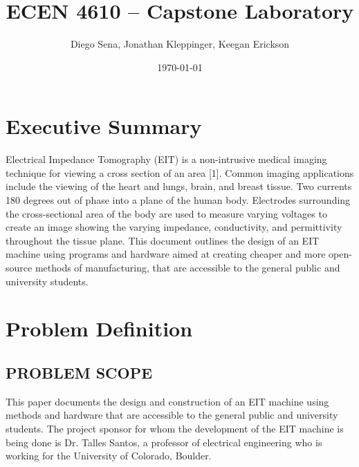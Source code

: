 \documentclass[12pt]{article}
\title{ECEN 4610 -- Capstone Laboratory}
\author{Diego Sena, Jonathan Kleppinger, Keegan Erickson}
\date{\today}
\begin{document}
\begin{titlepage}
    \maketitle
\end{titlepage}

\tableofcontents
\pagebreak
{}
\section{Executive Summary}\label{executive-summary}
Electrical Impedance Tomography (EIT) is a non-intrusive medical imaging
technique for viewing a cross section of an area {[}1{]}. Common imaging
applications include the viewing of the heart and lungs, brain, and
breast tissue. Two currents 180 degrees out of phase into a plane of the
human body. Electrodes surrounding the cross-sectional area of the body
are used to measure varying voltages to create an image showing the
varying impedance, conductivity, and permittivity throughout the tissue
plane. This document outlines the design of an EIT machine using
programs and hardware aimed at creating cheaper and more open-source
methods of manufacturing, that are accessible to the general public and
university students.

\section{Problem Definition}\label{problem-definition}

\subsection{PROBLEM SCOPE}\label{problem-scope}

This paper documents the design and construction of an EIT machine using
methods and hardware that are accessible to the general public and
university students. The project sponsor for whom the development of the
EIT machine is being done is Dr. Talles Santos, a professor of
electrical engineering who is working for the University of Colorado,
Boulder.\\
\end{document}
